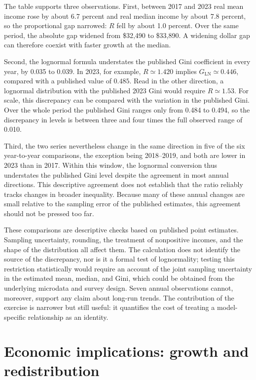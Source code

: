 \documentclass[11pt,a4paper]{article}
\begin{document}
The table supports three observations. First, between 2017 and 2023 real mean income rose by about 6.7 percent and real median income by about 7.8 percent, so the proportional gap narrowed: $R$ fell by about 1.0 percent. Over the same period, the absolute gap widened from \$32,490 to \$33,890. A widening dollar gap can therefore coexist with faster growth at the median.

Second, the lognormal formula understates the published Gini coefficient in every year, by 0.035 to 0.039. In 2023, for example, $R\simeq1.420$ implies $G_{\mathrm{LN}}\simeq0.446$, compared with a published value of $0.485$. Read in the other direction, a lognormal distribution with the published 2023 Gini would require $R\simeq1.53$. For scale, this discrepancy can be compared with the variation in the published Gini. Over the whole period the published Gini ranges only from 0.484 to 0.494, so the discrepancy in levels is between three and four times the full observed range of 0.010.

Third, the two series nevertheless change in the same direction in five of the six year-to-year comparisons, the exception being 2018--2019, and both are lower in 2023 than in 2017. Within this window, the lognormal conversion thus understates the published Gini level despite the agreement in most annual directions. This descriptive agreement does not establish that the ratio reliably tracks changes in broader inequality. Because many of these annual changes are small relative to the sampling error of the published estimates, this agreement should not be pressed too far.

These comparisons are descriptive checks based on published point estimates. Sampling uncertainty, rounding, the treatment of nonpositive incomes, and the shape of the distribution all affect them. The calculation does not identify the source of the discrepancy, nor is it a formal test of lognormality; testing this restriction statistically would require an account of the joint sampling uncertainty in the estimated mean, median, and Gini, which could be obtained from the underlying microdata and survey design. Seven annual observations cannot, moreover, support any claim about long-run trends. The contribution of the exercise is narrower but still useful: it quantifies the cost of treating a model-specific relationship as an identity.


\section{Economic implications: growth and redistribution}
\label{sec:implications}
\end{document}

